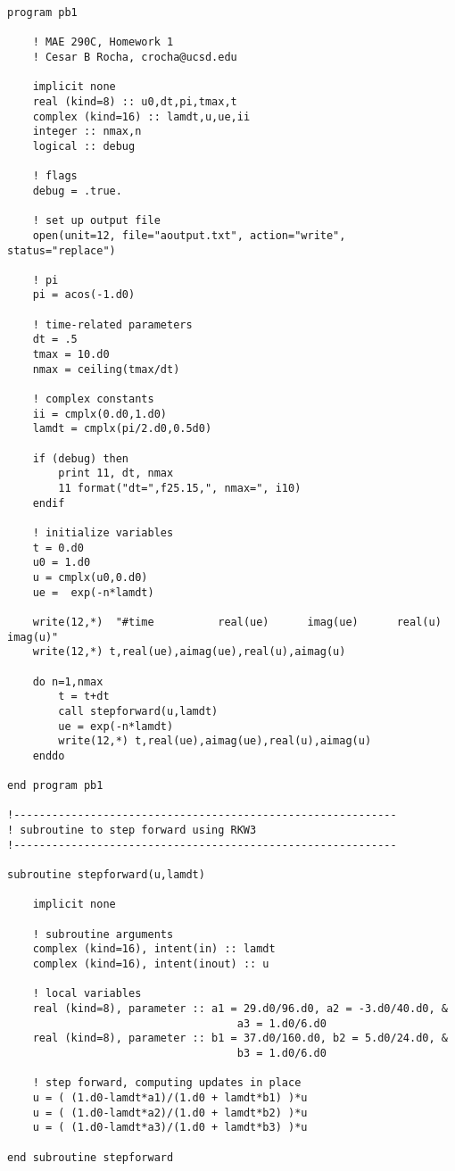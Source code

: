 \documentclass[11pt]{article}
\begin{document}
\begin{lstlisting}
program pb1

    ! MAE 290C, Homework 1
    ! Cesar B Rocha, crocha@ucsd.edu

    implicit none
    real (kind=8) :: u0,dt,pi,tmax,t
    complex (kind=16) :: lamdt,u,ue,ii
    integer :: nmax,n
    logical :: debug

    ! flags
    debug = .true.

    ! set up output file
    open(unit=12, file="aoutput.txt", action="write", status="replace")

    ! pi
    pi = acos(-1.d0)

    ! time-related parameters
    dt = .5
    tmax = 10.d0
    nmax = ceiling(tmax/dt)

    ! complex constants
    ii = cmplx(0.d0,1.d0)
    lamdt = cmplx(pi/2.d0,0.5d0)

    if (debug) then
        print 11, dt, nmax
        11 format("dt=",f25.15,", nmax=", i10)
    endif

    ! initialize variables
    t = 0.d0
    u0 = 1.d0
    u = cmplx(u0,0.d0)
    ue =  exp(-n*lamdt)

    write(12,*)  "#time          real(ue)      imag(ue)      real(u)        imag(u)"
    write(12,*) t,real(ue),aimag(ue),real(u),aimag(u)

    do n=1,nmax
        t = t+dt
        call stepforward(u,lamdt)
        ue = exp(-n*lamdt)
        write(12,*) t,real(ue),aimag(ue),real(u),aimag(u)
    enddo

end program pb1

!------------------------------------------------------------
! subroutine to step forward using RKW3
!------------------------------------------------------------

subroutine stepforward(u,lamdt)

    implicit none

    ! subroutine arguments
    complex (kind=16), intent(in) :: lamdt
    complex (kind=16), intent(inout) :: u

    ! local variables
    real (kind=8), parameter :: a1 = 29.d0/96.d0, a2 = -3.d0/40.d0, & 
                                    a3 = 1.d0/6.d0
    real (kind=8), parameter :: b1 = 37.d0/160.d0, b2 = 5.d0/24.d0, & 
                                    b3 = 1.d0/6.d0

    ! step forward, computing updates in place
    u = ( (1.d0-lamdt*a1)/(1.d0 + lamdt*b1) )*u 
    u = ( (1.d0-lamdt*a2)/(1.d0 + lamdt*b2) )*u 
    u = ( (1.d0-lamdt*a3)/(1.d0 + lamdt*b3) )*u 

end subroutine stepforward
\end{lstlisting}
\end{document}
